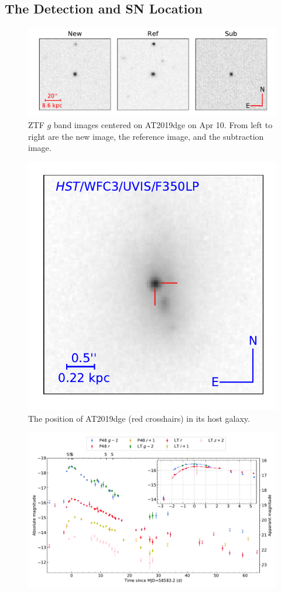 \documentclass[twocolumn]{aastex63}
\begin{document}
\begin{CJK*}{UTF8}{gbsn}
\subsection{The Detection and SN Location}
\begin{figure}[htbp!]
    \centering
    \includegraphics[width=\columnwidth]{figures/detection.pdf}
    \caption{ZTF $g$ band images centered on AT2019dge on Apr 10. From left to right are the new 
    image, the reference image, and the subtraction image. \ \label{fig:detection}}
\end{figure}
\begin{figure}
	\centering
	\includegraphics[width=0.6\columnwidth]{figures/offset.pdf}
	\caption{The position of AT2019dge (red crosshairs) in its host galaxy.
		\label{fig:offset}}
\end{figure}
\begin{figure}[htbp!]
	\centering
	\includegraphics[width=\textwidth]{figures/lightcurve.pdf}

\end{figure}
\end{CJK*}
\end{document}
